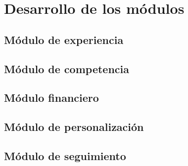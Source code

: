 
\chapter{Desarrollo de los módulos}\label{mod:concentrado}


     \label{mod:general}

    \section{Módulo de experiencia}\label{mod:exp}
    

    \section{Módulo de competencia}\label{mod:comp}
    


    \section{Módulo financiero}\label{mod:financ}
    

    \section{Módulo de personalización}\label{mod:pers}
    


    \section{Módulo de seguimiento}\label{mod:seguim}
    
